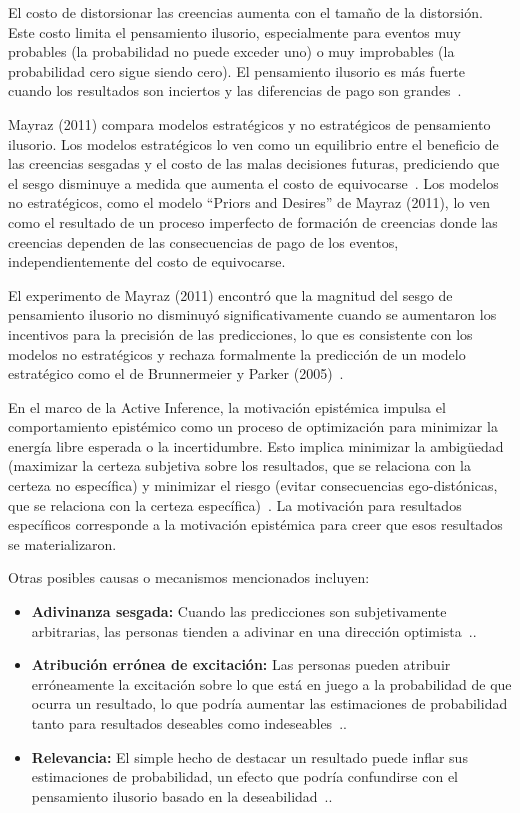 \documentclass[12pt, a4paper, twoside]{article}
\begin{document}
El costo de distorsionar las creencias aumenta con el tamaño de la distorsión. Este costo limita el pensamiento ilusorio, especialmente para eventos muy 
probables (la probabilidad no puede exceder uno) o muy improbables (la probabilidad cero sigue siendo cero). El pensamiento ilusorio es más fuerte cuando 
los resultados son inciertos y las diferencias de pago son grandes~\cite{caplin2019wishful}.


Mayraz (2011) compara modelos estratégicos y no estratégicos de pensamiento ilusorio. Los modelos estratégicos lo ven como un equilibrio entre el beneficio 
de las creencias sesgadas y el costo de las malas decisiones futuras, prediciendo que el sesgo disminuye a medida que aumenta el costo de equivocarse~\cite{mayraz2011wishful}. 
Los modelos no estratégicos, como el modelo ``Priors and Desires'' de Mayraz (2011), lo ven como el resultado de un proceso imperfecto de formación de creencias 
donde las creencias dependen de las consecuencias de pago de los eventos, independientemente del costo de equivocarse. 

El experimento de Mayraz (2011) 
encontró que la magnitud del sesgo de pensamiento ilusorio no disminuyó significativamente cuando se aumentaron los incentivos para la precisión de las predicciones, 
lo que es consistente con los modelos no estratégicos y rechaza formalmente la predicción de un modelo estratégico como el de Brunnermeier y Parker (2005)~\cite{mayraz2011wishful}.

En el marco de la Active Inference, la motivación epistémica impulsa el comportamiento epistémico como un proceso de optimización para minimizar la 
energía libre esperada o la incertidumbre. Esto implica minimizar la ambigüedad (maximizar la certeza subjetiva sobre los resultados, que se relaciona 
con la certeza no específica) y minimizar el riesgo (evitar consecuencias ego-distónicas, que se relaciona con la certeza específica)~\cite{kruglanski2020all}. 
La motivación para resultados específicos corresponde a la motivación epistémica para creer que esos resultados se materializaron.


Otras posibles causas o mecanismos mencionados incluyen:

\begin{itemize}
    \item \textbf{Adivinanza sesgada:} Cuando las predicciones son subjetivamente arbitrarias, las personas tienden a adivinar en una dirección optimista~\cite{krizan2009wishful}..
    \item \textbf{Atribución errónea de excitación:} Las personas pueden atribuir erróneamente la excitación sobre lo que está en juego a la probabilidad 
    de que ocurra un resultado, lo que podría aumentar las estimaciones de probabilidad tanto para resultados deseables como indeseables~\cite{krizan2009wishful}..
    \item \textbf{Relevancia:} El simple hecho de destacar un resultado puede inflar sus estimaciones de probabilidad, un efecto que podría confundirse con el 
    pensamiento ilusorio basado en la deseabilidad~\cite{krizan2009wishful}..
\end{itemize}
\end{document}
